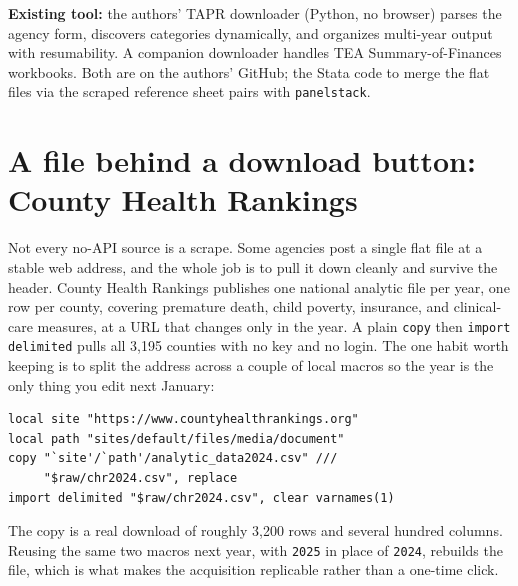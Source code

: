 \documentclass[
    a4paper,
    fontsize=10pt,
    twoside=true,
    numbers=noenddot,
]{kaobook}
\begin{document}
\begin{kaobox}[frametitle=Package Integration: \texttt{TEA-TAPR-download}]
\textbf{Existing tool:} the authors' TAPR downloader (Python, no browser) parses the agency form, discovers categories dynamically, and organizes multi-year output with resumability. A companion downloader handles TEA Summary-of-Finances workbooks. Both are on the authors' GitHub; the Stata code to merge the flat files via the scraped reference sheet pairs with \texttt{panelstack}.
\end{kaobox}

\section{A file behind a download button: County Health Rankings}\label{sec:chr}
Not every no-API source is a scrape. Some agencies post a single flat file at a stable web address, and the whole job is to pull it down cleanly and survive the header. County Health Rankings publishes one national analytic file per year, one row per county, covering premature death, child poverty, insurance, and clinical-care measures, at a URL that changes only in the year. A plain \texttt{copy} then \texttt{import delimited} pulls all 3{,}195 counties with no key and no login. The one habit worth keeping is to split the address across a couple of local macros so the year is the only thing you edit next January:
{\footnotesize
\begin{verbatim}
local site "https://www.countyhealthrankings.org"
local path "sites/default/files/media/document"
copy "`site'/`path'/analytic_data2024.csv" ///
     "$raw/chr2024.csv", replace
import delimited "$raw/chr2024.csv", clear varnames(1)
\end{verbatim}
}
The copy is a real download of roughly 3{,}200 rows and several hundred columns. Reusing the same two macros next year, with \texttt{2025} in place of \texttt{2024}, rebuilds the file, which is what makes the acquisition replicable rather than a one-time click.
\end{document}
